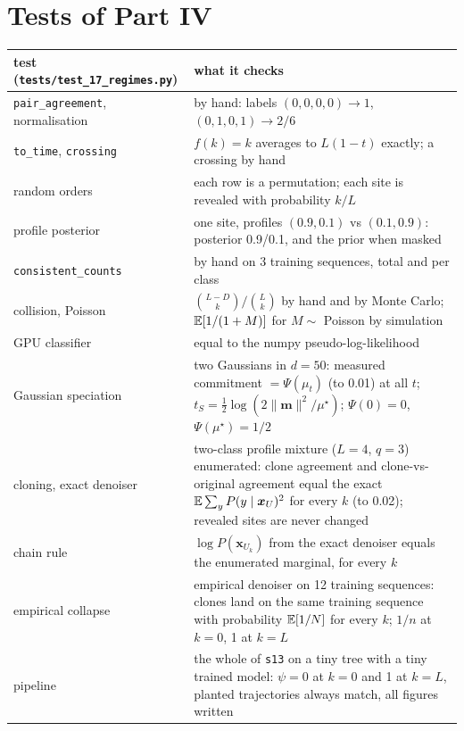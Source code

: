 \section{Tests of Part IV}\label{sec:dr_tests}
\begin{center}\footnotesize
\begin{tabular}{p{5.2cm}p{9cm}}
\toprule
test (\texttt{tests/test\_17\_regimes.py}) & what it checks\\
\midrule
\texttt{pair\_agreement}, normalisation & by hand: labels $(0,0,0,0)\to1$, $(0,1,0,1)\to2/6$\\
\texttt{to\_time}, \texttt{crossing} & $f(k)=k$ averages to $L(1-t)$ exactly; a crossing by hand\\
random orders & each row is a permutation; each site is revealed with probability $k/L$\\
profile posterior & one site, profiles $(0.9,0.1)$ vs $(0.1,0.9)$: posterior 0.9/0.1, and the prior when masked\\
\texttt{consistent\_counts} & by hand on 3 training sequences, total and per class\\
collision, Poisson & $\binom{L-D}k/\binom Lk$ by hand and by Monte Carlo; $\mathbb{E}[1/(1+M)]$ for $M\sim$ Poisson by simulation\\
GPU classifier & equal to the numpy pseudo-log-likelihood\\
Gaussian speciation & two Gaussians in $d=50$: measured commitment $=\Psi(\mu_t)$ (to 0.01) at all $t$; $t_S=\frac12\log(2\|\bm m\|^2/\mu^\star)$; $\Psi(0)=0$, $\Psi(\mu^\star)=1/2$\\
cloning, exact denoiser & two-class profile mixture ($L=4$, $q=3$) enumerated: clone agreement and clone-vs-original agreement equal the exact $\mathbb{E}\sum_yP(y\mid\bm x_U)^2$ for every $k$ (to 0.02); revealed sites are never changed\\
chain rule & $\log P(\bm x_{U_k})$ from the exact denoiser equals the enumerated marginal, for every $k$\\
empirical collapse & empirical denoiser on 12 training sequences: clones land on the same training sequence with probability $\mathbb{E}[1/N]$ for every $k$; $1/n$ at $k=0$, 1 at $k=L$\\
pipeline & the whole of \texttt{s13} on a tiny tree with a tiny trained model: $\psi=0$ at $k=0$ and 1 at $k=L$, planted trajectories always match, all figures written\\
\bottomrule
\end{tabular}
\end{center}

